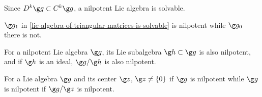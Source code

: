 Since $D^k \g g \subset C^k \g g$, a nilpotent Lie algebra is solvable.

$\g g_1$ in \ref{lie-algebra-of-triangular-matrices-is-solvable} is nilpotent while $\g g_0$ there is not.

For a nilpotent Lie algebra $\g g$, its Lie subalgebra $\g h \subset \g g$ is also nilpotent, and if $\g h$ is an ideal, $\g g/ \g h$ is also nilpotent.

For a Lie algebra $\g g$ and its center $\g z$, $\g z \neq \{ 0 \}$ if $\g g$ is nilpotent while $\g g$ is nilpotent if $\g g / \g z$ is nilpotent.
